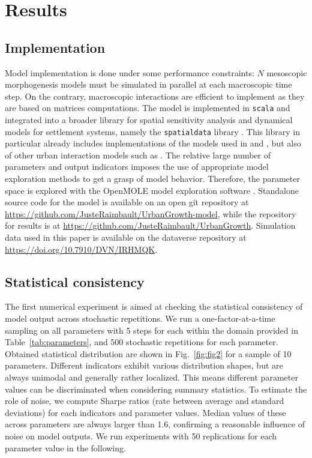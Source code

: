 \documentclass[11pt]{article}
\begin{document}
\section{Results}



\subsection{Implementation}

Model implementation is done under some performance constraints: $N$ mesoscopic morphogenesis models must be simulated in parallel at each macroscopic time step. On the contrary, macroscopic interactions are efficient to implement as they are based on matrices computations. The model is implemented in \texttt{scala} and integrated into a broader library for spatial sensitivity analysis and dynamical models for settlement systems, namely the \texttt{spatialdata} library \cite{raimbault2020scala}. This library in particular already includes implementations of the models used in \cite{raimbault2020indirect} and \cite{raimbault2018calibration}, but also of other urban interaction models such as \cite{favaro2011gibrat}. The relative large number of parameters and output indicators imposes the use of appropriate model exploration methods to get a grasp of model behavior. Therefore, the parameter space is explored with the OpenMOLE model exploration software \cite{reuillon2013openmole}. Standalone source code for the model is available on an open git repository at \url{https://github.com/JusteRaimbault/UrbanGrowth-model}, while the repository for results is at \url{https://github.com/JusteRaimbault/UrbanGrowth}. Simulation data used in this paper is available on the dataverse repository at \url{https://doi.org/10.7910/DVN/IRHMQK}.


\subsection{Statistical consistency}




The first numerical experiment is aimed at checking the statistical consistency of model output across stochastic repetitions. We run a one-factor-at-a-time sampling on all parameters with 5 steps for each within the domain provided in Table~\ref{tab:parameters}, and 500 stochastic repetitions for each parameter.%
Obtained statistical distribution are shown in Fig.~\ref{fig:fig2} for a sample of 10 parameters. Different indicators exhibit various distribution shapes, but are always unimodal and generally rather localized. This means different parameter values can be discriminated when considering summary statistics. To estimate the role of noise, we compute Sharpe ratios (rate between average and standard deviations) for each indicators and parameter values. Median values of these across parameters are always larger than 1.6, confirming a reasonable influence of noise on model outputs. We run experiments with 50 replications for each parameter value in the following.
\end{document}
